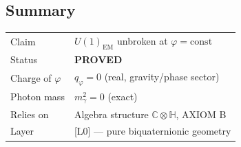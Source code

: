 \documentclass[12pt]{article}
\theoremstyle{definition}
\theoremstyle{remark}
\begin{document}
\subsection{Summary}

\begin{center}
\begin{tabular}{ll}
\hline
Claim & $U(1)_\mathrm{EM}$ unbroken at $\varphi = \mathrm{const}$ \\
Status & \textbf{PROVED} \\
Charge of $\varphi$ & $q_\varphi = 0$ (real, gravity/phase sector) \\
Photon mass & $m_\gamma^2 = 0$ (exact) \\
Relies on & Algebra structure $\mathbb{C}\otimes\mathbb{H}$, AXIOM B \\
Layer & [L0] — pure biquaternionic geometry \\
\hline
\end{tabular}
\end{center}

\ifdefined\INCLUDEMODE\else
  
\end{document}
